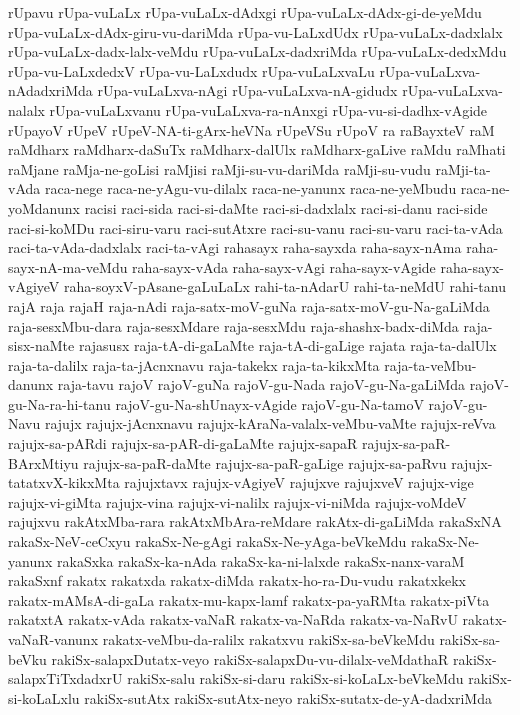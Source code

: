 {rUpavu
rUpa-vuLaLx
rUpa-vuLaLx-dAdxgi
rUpa-vuLaLx-dAdx-gi-de-yeMdu
rUpa-vuLaLx-dAdx-giru-vu-dariMda
rUpa-vu-LaLxdUdx
rUpa-vuLaLx-dadxlalx
rUpa-vuLaLx-dadx-lalx-veMdu
rUpa-vuLaLx-dadxriMda
rUpa-vuLaLx-dedxMdu
rUpa-vu-LaLxdedxV
rUpa-vu-LaLxdudx
rUpa-vuLaLxvaLu
rUpa-vuLaLxva-nAdadxriMda
rUpa-vuLaLxva-nAgi
rUpa-vuLaLxva-nA-gidudx
rUpa-vuLaLxva-nalalx
rUpa-vuLaLxvanu
rUpa-vuLaLxva-ra-nAnxgi
rUpa-vu-si-dadhx-vAgide
rUpayoV
rUpeV
rUpeV-NA-ti-gArx-heVNa
rUpeVSu
rUpoV
ra
raBayxteV
raM
raMdharx
raMdharx-daSuTx
raMdharx-dalUlx
raMdharx-gaLive
raMdu
raMhati
raMjane
raMja-ne-goLisi
raMjisi
raMji-su-vu-dariMda
raMji-su-vudu
raMji-ta-vAda
raca-nege
raca-ne-yAgu-vu-dilalx
raca-ne-yanunx
raca-ne-yeMbudu
raca-ne-yoMdanunx
racisi
raci-sida
raci-si-daMte
raci-si-dadxlalx
raci-si-danu
raci-side
raci-si-koMDu
raci-siru-varu
raci-sutAtxre
raci-su-vanu
raci-su-varu
raci-ta-vAda
raci-ta-vAda-dadxlalx
raci-ta-vAgi
rahasayx
raha-sayxda
raha-sayx-nAma
raha-sayx-nA-ma-veMdu
raha-sayx-vAda
raha-sayx-vAgi
raha-sayx-vAgide
raha-sayx-vAgiyeV
raha-soyxV-pAsane-gaLuLaLx
rahi-ta-nAdarU
rahi-ta-neMdU
rahi-tanu
rajA
raja
rajaH
raja-nAdi
raja-satx-moV-guNa
raja-satx-moV-gu-Na-gaLiMda
raja-sesxMbu-dara
raja-sesxMdare
raja-sesxMdu
raja-shashx-badx-diMda
raja-sisx-naMte
rajasusx
raja-tA-di-gaLaMte
raja-tA-di-gaLige
rajata
raja-ta-dalUlx
raja-ta-dalilx
raja-ta-jAcnxnavu
raja-takekx
raja-ta-kikxMta
raja-ta-veMbu-danunx
raja-tavu
rajoV
rajoV-guNa
rajoV-gu-Nada
rajoV-gu-Na-gaLiMda
rajoV-gu-Na-ra-hi-tanu
rajoV-gu-Na-shUnayx-vAgide
rajoV-gu-Na-tamoV
rajoV-gu-Navu
rajujx
rajujx-jAcnxnavu
rajujx-kAraNa-valalx-veMbu-vaMte
rajujx-reVva
rajujx-sa-pARdi
rajujx-sa-pAR-di-gaLaMte
rajujx-sapaR
rajujx-sa-paR-BArxMtiyu
rajujx-sa-paR-daMte
rajujx-sa-paR-gaLige
rajujx-sa-paRvu
rajujx-tatatxvX-kikxMta
rajujxtavx
rajujx-vAgiyeV
rajujxve
rajujxveV
rajujx-vige
rajujx-vi-giMta
rajujx-vina
rajujx-vi-nalilx
rajujx-vi-niMda
rajujx-voMdeV
rajujxvu
rakAtxMba-rara
rakAtxMbAra-reMdare
rakAtx-di-gaLiMda
rakaSxNA
rakaSx-NeV-ceCxyu
rakaSx-Ne-gAgi
rakaSx-Ne-yAga-beVkeMdu
rakaSx-Ne-yanunx
rakaSxka
rakaSx-ka-nAda
rakaSx-ka-ni-lalxde
rakaSx-nanx-varaM
rakaSxnf
rakatx
rakatxda
rakatx-diMda
rakatx-ho-ra-Du-vudu
rakatxkekx
rakatx-mAMsA-di-gaLa
rakatx-mu-kapx-lamf
rakatx-pa-yaRMta
rakatx-piVta
rakatxtA
rakatx-vAda
rakatx-vaNaR
rakatx-va-NaRda
rakatx-va-NaRvU
rakatx-vaNaR-vanunx
rakatx-veMbu-da-ralilx
rakatxvu
rakiSx-sa-beVkeMdu
rakiSx-sa-beVku
rakiSx-salapxDutatx-veyo
rakiSx-salapxDu-vu-dilalx-veMdathaR
rakiSx-salapxTiTxdadxrU
rakiSx-salu
rakiSx-si-daru
rakiSx-si-koLaLx-beVkeMdu
rakiSx-si-koLaLxlu
rakiSx-sutAtx
rakiSx-sutAtx-neyo
rakiSx-sutatx-de-yA-dadxriMda
}
